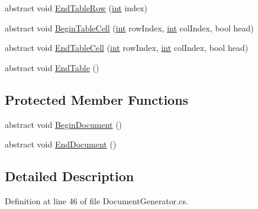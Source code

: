 \begin{DoxyCompactItemize}
abstract void \hyperlink{class_software_engineering_tools_1_1_documentation_1_1_document_generator_a0c815504fc6e9d7e2c49f114fdd93a88}{End\+Table\+Row} (\hyperlink{namespace_software_engineering_tools_1_1_documentation_a4a8017aa254d1d05b03db5132b7dd3a7afa7153f7ed1cb6c0fcf2ffb2fac21748}{int} index)
\item 
abstract void \hyperlink{class_software_engineering_tools_1_1_documentation_1_1_document_generator_a142486e159cf18396bad17686c4ece3b}{Begin\+Table\+Cell} (\hyperlink{namespace_software_engineering_tools_1_1_documentation_a4a8017aa254d1d05b03db5132b7dd3a7afa7153f7ed1cb6c0fcf2ffb2fac21748}{int} row\+Index, \hyperlink{namespace_software_engineering_tools_1_1_documentation_a4a8017aa254d1d05b03db5132b7dd3a7afa7153f7ed1cb6c0fcf2ffb2fac21748}{int} col\+Index, bool head)
\item 
abstract void \hyperlink{class_software_engineering_tools_1_1_documentation_1_1_document_generator_ad7358d1047a392ce8d23e01d6c541e72}{End\+Table\+Cell} (\hyperlink{namespace_software_engineering_tools_1_1_documentation_a4a8017aa254d1d05b03db5132b7dd3a7afa7153f7ed1cb6c0fcf2ffb2fac21748}{int} row\+Index, \hyperlink{namespace_software_engineering_tools_1_1_documentation_a4a8017aa254d1d05b03db5132b7dd3a7afa7153f7ed1cb6c0fcf2ffb2fac21748}{int} col\+Index, bool head)
\item 
abstract void \hyperlink{class_software_engineering_tools_1_1_documentation_1_1_document_generator_a6244abdf686183395fb44339111a7363}{End\+Table} ()
\end{DoxyCompactItemize}
\subsection*{Protected Member Functions}
\begin{DoxyCompactItemize}
\item 
abstract void \hyperlink{class_software_engineering_tools_1_1_documentation_1_1_document_generator_a6dcea40e796970bba1229a2e513fdb56}{Begin\+Document} ()
\item 
abstract void \hyperlink{class_software_engineering_tools_1_1_documentation_1_1_document_generator_ae367934e4153adfd260dec902d0e69d5}{End\+Document} ()
\end{DoxyCompactItemize}


\subsection{Detailed Description}


Definition at line 46 of file Document\+Generator.\+cs.



